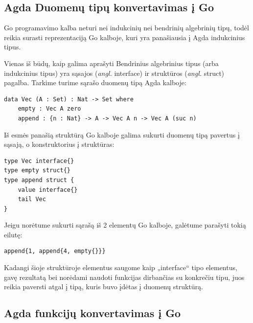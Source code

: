 \documentclass{VUMIFPSbakalaurinis}
\begin{document}
\subsection{Agda Duomenų tipų konvertavimas į Go}
Go programavimo kalba neturi nei indukcinių nei bendrinių algebrinių tipų, todėl reikia surasti reprezentaciją Go kalboje, kuri yra panašiausia į Agda indukcinius tipus.\par Vienas iš būdų, kaip galima aprašyti Bendrinius algebrinius tipus (arba indukcinius tipus) yra sąsajos (\textit{angl.} interface) ir struktūros (\textit{angl.} struct) pagalba. Tarkime turime sąrašo duomenų tipą Agda kalboje:
\begin{lstlisting}
data Vec (A : Set) : Nat -> Set where
	empty : Vec A zero
	append : {n : Nat} -> A -> Vec A n -> Vec A (suc n)
\end{lstlisting}
Iš esmės panašią struktūrą Go kalboje galima sukurti duomenų tipą pavertus į sąsają, o konstruktorius į struktūras:
\begin{lstlisting}[language=GoCust]
type Vec interface{}
type empty struct{}
type append struct {
	value interface{}
	tail Vec
}
\end{lstlisting}
Jeigu norėtume sukurti sąrašą iš 2 elementų Go kalboje, galėtume parašyti tokią eilutę: 
\begin{lstlisting}[language=GoCust]
append{1, append{4, empty{}}}
	\end{lstlisting}
Kadangi šioje struktūroje elementus saugome kaip „interface{}“ tipo elementus, gavę rezultatą bei norėdami naudoti funkcijas dirbančias su konkrečiu tipu, juos reikia paversti atgal į tipą, kuris buvo įdėtas į duomenų struktūrą.
\subsection{Agda funkcijų konvertavimas į Go}
\end{document}
